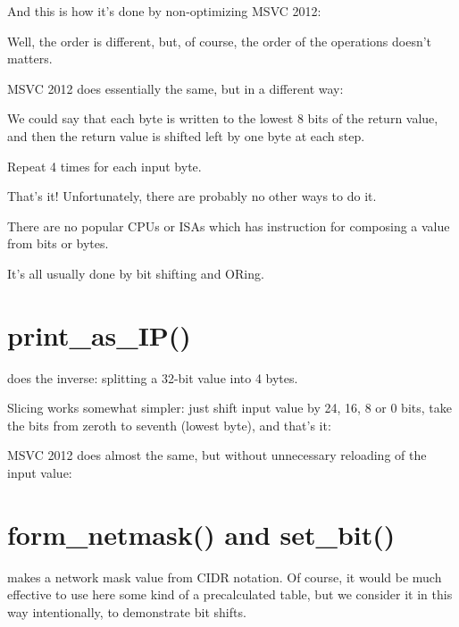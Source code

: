 And this is how it's done by non-optimizing MSVC 2012:



Well, the order is different, but, of course, the order of the operations doesn't matters.

\Optimizing MSVC 2012 does essentially the same, but in a different way:



We could say that each byte is written to the lowest 8 bits of the return value, 
and then the return value is shifted left by one byte at each step.

Repeat 4 times for each input byte.

\par
That's it! Unfortunately, there are probably no other ways to do it.

There are no popular \ac{CPU}s or \ac{ISA}s which has instruction for composing a value from
bits or bytes.

It's all usually done by bit shifting and ORing.

\section{print\_as\_IP()}

 does the inverse: splitting a 32-bit value into 4 bytes.

Slicing works somewhat simpler: just shift input value by 24, 16, 8 or 0 bits, take the 
bits from zeroth to seventh (lowest byte), and that's it:



\Optimizing MSVC 2012 does almost the same, but without unnecessary reloading of the input value:



\section{form\_netmask() and set\_bit()}

 makes a network mask value from \ac{CIDR} notation.
Of course, it would be much effective to use here some kind of a precalculated table, but we consider it in this
way intentionally, to demonstrate bit shifts.

